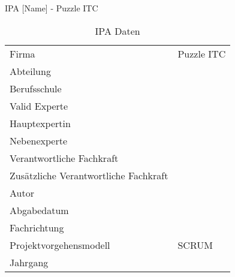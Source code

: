 \begin{titlepage}
    \Huge IPA [Name] - Puzzle ITC\normalsize
  \bigbreak
  \begin{table}[h!]
      \begin{tabular}{|L{0.4\textwidth}|L{0.5\textwidth}|}
          \hline
            \\[12pt]
          \hline
          Firma & Puzzle ITC \\
          \hline
          Abteilung & \\
          \hline
          Berufsschule & \\
          \hline
          Valid Experte & \\
          \hline
          Hauptexpertin & \\
          \hline
          Nebenexperte & \\
          \hline
          Verantwortliche Fachkraft & \\
          \hline
          Zusätzliche Verantwortliche Fachkraft & \\
          \hline
          Autor & \\
          \hline
          Abgabedatum & \\
          \hline
          Fachrichtung & \\
          \hline
          Projektvorgehensmodell & SCRUM \\
          \hline
          Jahrgang & \\
          \hline
        \end{tabular}
        \caption{IPA Daten}
  \end{table}
\end{titlepage}
